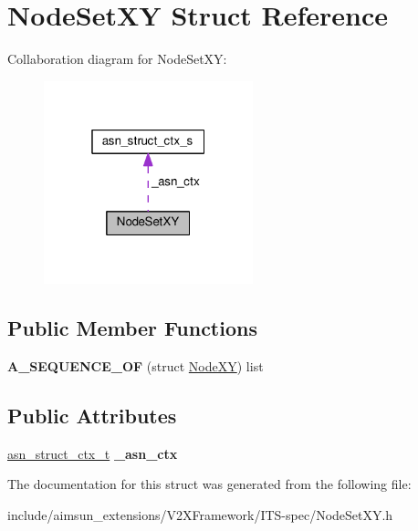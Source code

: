 \hypertarget{structNodeSetXY}{}\section{Node\+Set\+XY Struct Reference}
\label{structNodeSetXY}


Collaboration diagram for Node\+Set\+XY\+:\nopagebreak
\begin{figure}[H]
\begin{center}
\leavevmode
\includegraphics[width=172pt]{structNodeSetXY__coll__graph}
\end{center}
\end{figure}
\subsection*{Public Member Functions}
\begin{DoxyCompactItemize}
\item 
{\bfseries A\+\_\+\+S\+E\+Q\+U\+E\+N\+C\+E\+\_\+\+OF} (struct \hyperlink{structNodeXY}{Node\+XY}) list\hypertarget{structNodeSetXY_aba2d12dc028be51df12f7aa424578764}{}\label{structNodeSetXY_aba2d12dc028be51df12f7aa424578764}

\end{DoxyCompactItemize}
\subsection*{Public Attributes}
\begin{DoxyCompactItemize}
\item 
\hyperlink{structasn__struct__ctx__s}{asn\+\_\+struct\+\_\+ctx\+\_\+t} {\bfseries \+\_\+asn\+\_\+ctx}\hypertarget{structNodeSetXY_a7a42682eeec6e530505fc0953ac4c71b}{}\label{structNodeSetXY_a7a42682eeec6e530505fc0953ac4c71b}

\end{DoxyCompactItemize}


The documentation for this struct was generated from the following file\+:\begin{DoxyCompactItemize}
\item 
include/aimsun\+\_\+extensions/\+V2\+X\+Framework/\+I\+T\+S-\/spec/Node\+Set\+X\+Y.\+h\end{DoxyCompactItemize}
